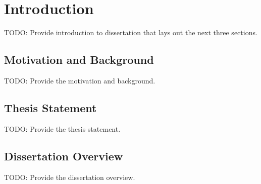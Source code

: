 \chapter{Introduction}
TODO: Provide introduction to dissertation that lays out the next three
sections.

\section{Motivation and Background}
TODO: Provide the motivation and background.

\section{Thesis Statement}
TODO: Provide the thesis statement.

\section{Dissertation Overview}
TODO: Provide the dissertation overview.
